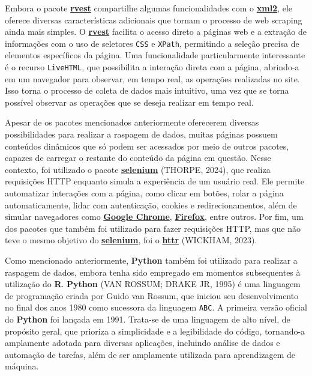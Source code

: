 \documentclass[
  12pt,
  a4paper,
]{scrreprt}
\begin{document}
Embora o pacote \href{https://rvest.tidyverse.org/}{\textbf{rvest}}
compartilhe algumas funcionalidades com o
\href{https://xml2.r-lib.org/}{\textbf{xml2}}, ele oferece diversas
características adicionais que tornam o processo de web scraping ainda
mais simples. O \href{https://rvest.tidyverse.org/}{\textbf{rvest}}
facilita o acesso direto a páginas web e a extração de informações com o
uso de seletores \texttt{CSS} e \texttt{XPath}, permitindo a seleção
precisa de elementos específicos da página. Uma funcionalidade
particularmente interessante é o recurso \texttt{LiveHTML}, que
possibilita a interação direta com a página, abrindo-a em um navegador
para observar, em tempo real, as operações realizadas no site. Isso
torna o processo de coleta de dados mais intuitivo, uma vez que se torna
possível observar as operações que se deseja realizar em tempo real.

\vspace{12pt}

Apesar de os pacotes mencionados anteriormente oferecerem diversas
possibilidades para realizar a raspagem de dados, muitas páginas possuem
conteúdos dinâmicos que só podem ser acessados por meio de outros
pacotes, capazes de carregar o restante do conteúdo da página em
questão. Nesse contexto, foi utilizado o pacote
\href{https://cran.r-project.org/web/packages/selenium/index.html}{\textbf{selenium}}
(THORPE, 2024), que realiza requisições HTTP enquanto simula a
experiência de um usuário real. Ele permite automatizar interações com a
página, como clicar em botões, rolar a página automaticamente, lidar com
autenticação, cookies e redirecionamentos, além de simular navegadores
como
\href{https://www.google.com/chrome/dr/download/?brand=FHFK&ds_kid=43700077650614081&gclsrc=aw.ds&gad_source=1&gclid=Cj0KCQjwqv2_BhC0ARIsAFb5Ac8iSe-rhSTchZ2msE2z-JoowXEWygO93PuoGW7iiQS2AUY3cRexf14aAueTEALw_wcB}{\textbf{Google
Chrome}},
\href{https://www.mozilla.org/pt-BR/firefox/}{\textbf{Firefox}}, entre
outros. Por fim, um dos pacotes que também foi utilizado para fazer
requisições HTTP, mas que não teve o mesmo objetivo do
\href{https://cran.r-project.org/web/packages/selenium/index.html}{\textbf{selenium}},
foi o \href{https://httr.r-lib.org/}{\textbf{httr}} (WICKHAM, 2023).

\vspace{12pt}

Como mencionado anteriormente, \textbf{Python} também foi utilizado para
realizar a raspagem de dados, embora tenha sido empregado em momentos
subsequentes à utilização do \textbf{R}. \textbf{Python} (VAN ROSSUM;
DRAKE JR, 1995) é uma linguagem de programação criada por Guido van
Rossum, que iniciou seu desenvolvimento no final dos anos 1980 como
sucessora da linguagem \texttt{ABC}. A primeira versão oficial do
\textbf{Python} foi lançada em 1991. Trata-se de uma linguagem de alto
nível, de propósito geral, que prioriza a simplicidade e a legibilidade
do código, tornando-a amplamente adotada para diversas aplicações,
incluindo análise de dados e automação de tarefas, além de ser
amplamente utilizada para aprendizagem de máquina.
\end{document}
